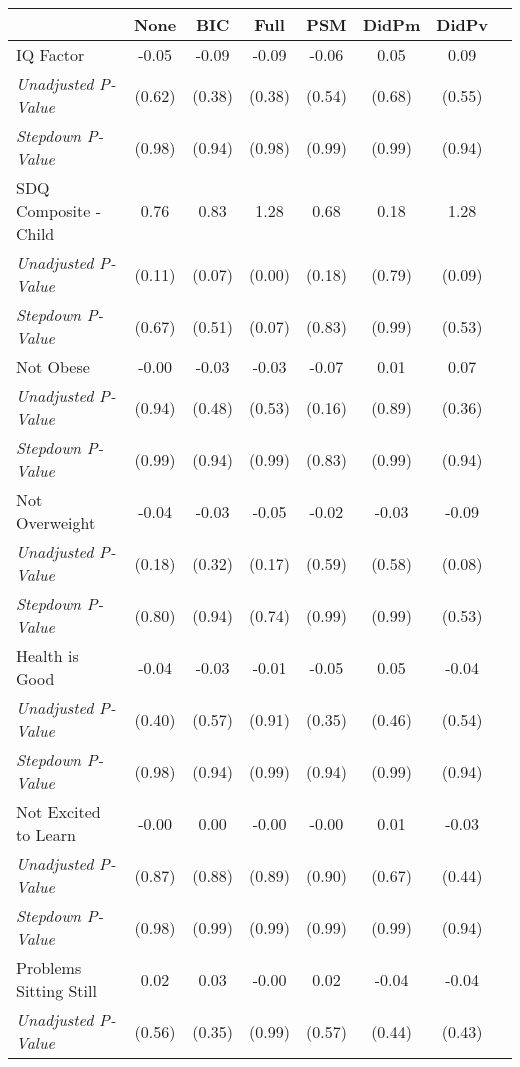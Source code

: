 \begin{tabular}{l c c c c c c c}
\toprule
 & None & BIC & Full & PSM & DidPm & DidPv \\
\midrule
IQ Factor & -0.05 & -0.09 & -0.09 & -0.06 & 0.05 & 0.09 \\
\quad \textit{Unadjusted P-Value} & (0.62) & (0.38) & (0.38) & (0.54) & (0.68) & (0.55) \\
\quad \textit{Stepdown P-Value} & (0.98) & (0.94) & (0.98) & (0.99) & (0.99) & (0.94) \\
SDQ Composite - Child & 0.76 & 0.83 & 1.28 & 0.68 & 0.18 & 1.28 \\
\quad \textit{Unadjusted P-Value} & (0.11) & (0.07) & (0.00) & (0.18) & (0.79) & (0.09) \\
\quad \textit{Stepdown P-Value} & (0.67) & (0.51) & (0.07) & (0.83) & (0.99) & (0.53) \\
Not Obese & -0.00 & -0.03 & -0.03 & -0.07 & 0.01 & 0.07 \\
\quad \textit{Unadjusted P-Value} & (0.94) & (0.48) & (0.53) & (0.16) & (0.89) & (0.36) \\
\quad \textit{Stepdown P-Value} & (0.99) & (0.94) & (0.99) & (0.83) & (0.99) & (0.94) \\
Not Overweight & -0.04 & -0.03 & -0.05 & -0.02 & -0.03 & -0.09 \\
\quad \textit{Unadjusted P-Value} & (0.18) & (0.32) & (0.17) & (0.59) & (0.58) & (0.08) \\
\quad \textit{Stepdown P-Value} & (0.80) & (0.94) & (0.74) & (0.99) & (0.99) & (0.53) \\
Health is Good & -0.04 & -0.03 & -0.01 & -0.05 & 0.05 & -0.04 \\
\quad \textit{Unadjusted P-Value} & (0.40) & (0.57) & (0.91) & (0.35) & (0.46) & (0.54) \\
\quad \textit{Stepdown P-Value} & (0.98) & (0.94) & (0.99) & (0.94) & (0.99) & (0.94) \\
Not Excited to Learn & -0.00 & 0.00 & -0.00 & -0.00 & 0.01 & -0.03 \\
\quad \textit{Unadjusted P-Value} & (0.87) & (0.88) & (0.89) & (0.90) & (0.67) & (0.44) \\
\quad \textit{Stepdown P-Value} & (0.98) & (0.99) & (0.99) & (0.99) & (0.99) & (0.94) \\
Problems Sitting Still & 0.02 & 0.03 & -0.00 & 0.02 & -0.04 & -0.04 \\
\quad \textit{Unadjusted P-Value} & (0.56) & (0.35) & (0.99) & (0.57) & (0.44) & (0.43) \\

\end{tabular}
